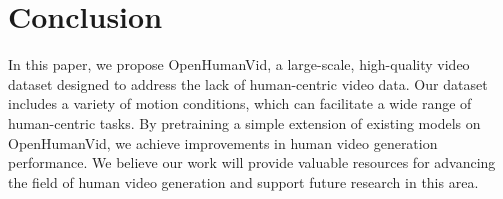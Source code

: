 \section{Conclusion}

In this paper, we propose OpenHumanVid, a large-scale, high-quality video dataset designed to address the lack of human-centric video data. Our dataset includes a variety of motion conditions, which can facilitate a wide range of human-centric tasks. By pretraining a simple extension of existing models on OpenHumanVid, we achieve improvements in human video generation performance. We believe our work will provide valuable resources for advancing the field of human video generation and support future research in this area.